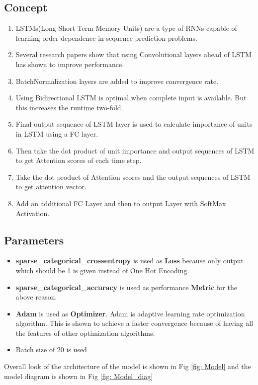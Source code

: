 \documentclass[11pt,english]{article}
\begin{document}
\subsection{Concept}
\begin{enumerate}
    \item LSTMs(Long Short Term Memory Units) are a type of RNNs capable of learning order dependence in sequence prediction problems.
    \item Several research papers show that using Convolutional layers ahead of LSTM has shown to improve performance.
    \item BatchNormalization layers are added to improve convergence rate.
    \item Using Bidirectional LSTM is optimal when complete input is available. But this increases the runtime two-fold.
    \item Final output sequence of LSTM layer is used to calculate importance of units in LSTM using a FC layer.
    \item Then take the dot product of unit importance and output sequences of LSTM to get Attention scores of each time step.
    \item Take the dot product of Attention scores and the output sequences of LSTM to get attention vector.
    \item Add an additional FC Layer and then to output Layer with SoftMax Activation.
\end{enumerate}

\subsection{Parameters}
\begin{itemize}
    \item \textbf{sparse\_categorical\_crossentropy} is used as \textbf{Loss} because only output which should be 1 is given instead of One Hot Encoding.
    \item \textbf{sparse\_categorical\_accuracy} is used as performance \textbf{Metric} for the above reason.
    \item \textbf{Adam} is used as \textbf{Optimizer}. Adam is adaptive learning rate optimization algorithm. This is shown to achieve a faster convergence because of having all the features of other optimization algorithms.
    \item Batch size of 20 is used
\end{itemize}
Overall look of the architecture of the model is shown in Fig \ref{fig: Model} and the model diagram is shown in Fig \ref{fig: Model_diag}
\end{document}
